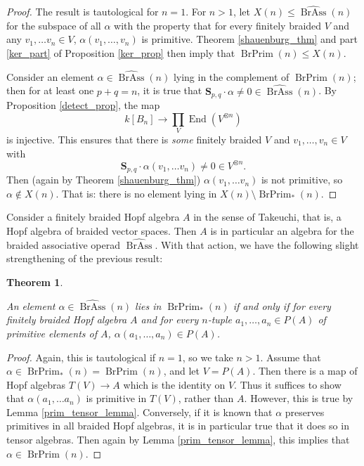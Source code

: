 \documentclass[12pt]{article}
\DeclareMathOperator{\End}{End}
\DeclareMathOperator{\BrAss}{BrAss}
\DeclareMathOperator{\BrPrim}{BrPrim}
\newcommand{\BrAsshat}{\widehat{\BrAss}} %
\newcommand{\bS} {\mathbf{S}}
\theoremstyle{plain}
\newtheorem{thm}{Theorem}[section]
\theoremstyle{definition}
\theoremstyle{remark}
\begin{document}
\begin{proof}

The result is tautological for $n=1$.  For $n>1$, let $X(n) \leq \BrAsshat(n)$ for the subspace of all $\alpha$ with the property that for every finitely braided $V$ and any $v_1, \dots v_n \in V$, $\alpha(v_1, \dots, v_n)$ is primitive.  Theorem \ref{shauenburg_thm} and part \ref{ker_part} of Proposition \ref{ker_prop} then imply that $\BrPrim(n) \leq X(n)$.

Consider an element $\alpha \in \BrAsshat(n)$ lying in the complement of $\BrPrim(n)$; then for at least one $p+q=n$, it is true that $\bS_{p,q} \cdot \alpha \neq 0 \in \BrAsshat(n)$.  By Proposition \ref{detect_prop}, the map
%
$$k[B_n] \to \prod_V \End(V^{\otimes n})$$
%
is injective.  This ensures that there is \emph{some} finitely braided $V$ and $v_1, \dots, v_n \in V$ with 
%
$$\bS_{p,q} \cdot \alpha(v_1, \dots v_n) \neq 0 \in V^{\otimes n}.$$
%
Then (again by Theorem \ref{shauenburg_thm}) $\alpha(v_1, \dots v_n)$ is not primitive, so $\alpha \notin X(n)$.  That is: there is no element lying in $X(n) \setminus \BrPrim_*(n)$.

\end{proof}


Consider a finitely braided Hopf algebra $A$ in the sense of Takeuchi, that is, a Hopf algebra of braided vector spaces.  Then $A$ is in particular an algebra for the braided associative operad $\BrAsshat$.  With that action, we have the following slight strengthening of the previous result:

\begin{thm} \label{br_lie_prim_thm}

An element $\alpha \in \BrAsshat(n)$ lies in $\BrPrim_*(n)$ if and only if for every finitely braided Hopf algebra $A$ and for every $n$-tuple $a_1, \dots, a_n \in P(A)$ of primitive elements of $A$, $\alpha(a_1, \dots, a_n) \in P(A)$. 

\end{thm}

\begin{proof}

Again, this is tautological if $n=1$, so we take $n>1$.  Assume that $\alpha \in \BrPrim_*(n) = \BrPrim(n)$, and let $V = P(A)$.  Then there is a map of Hopf algebras $T(V) \to A$ which is the identity on $V$.  Thus it suffices to show that $\alpha(a_1, \dots a_n)$ is primitive in $T(V)$, rather than $A$.  However, this is true by Lemma \ref{prim_tensor_lemma}.  Conversely, if it is known that $\alpha$ preserves primitives in all braided Hopf algebras, it is in particular true that it does so in tensor algebras.  Then again by Lemma \ref{prim_tensor_lemma}, this implies that $\alpha \in \BrPrim(n)$. 

\end{proof}
\end{document}
